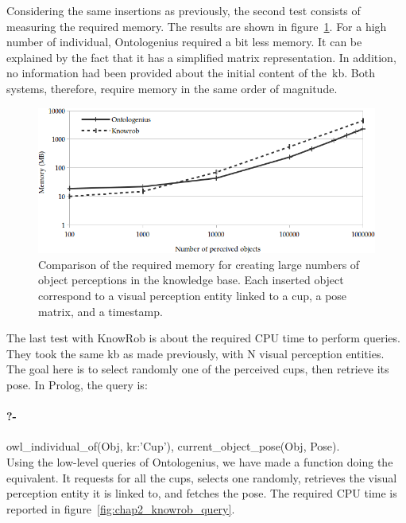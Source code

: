 Considering the same insertions as previously, the second test consists of measuring the required memory. The results are shown in figure~\ref{fig:chap2_knowrob_memory}. For a high number of individual, Ontologenius required a bit less memory. It can be explained by the fact that it has a simplified matrix representation. In addition, no information had been provided about the initial content of the~\acrshort{kb}. Both systems, therefore, require memory in the same order of magnitude.

\begin{figure}[ht!]
\centering
\includegraphics[width=\textwidth]{figures/chapter2/knowrob/Memory.png}
\caption{\label{fig:chap2_knowrob_memory} Comparison of the required memory for creating large numbers of object perceptions in the knowledge base. Each inserted object correspond to a visual perception entity linked to a cup, a pose matrix, and a timestamp.}
\end{figure}

The last test with KnowRob is about the required CPU time to perform queries. They took the same \acrshort{kb} as made previously, with N visual perception entities. The goal here is to select randomly one of the perceived cups, then retrieve its pose. In Prolog, the query is:

\paragraph{?-} owl\_individual\_of(Obj, kr:’Cup’), current\_object\_pose(Obj, Pose).\\

Using the low-level queries of Ontologenius, we have made a function doing the equivalent. It requests for all the cups, selects one randomly, retrieves the visual perception entity it is linked to, and fetches the pose. The required CPU time is reported in figure~\ref{fig:chap2_knowrob_query}.

